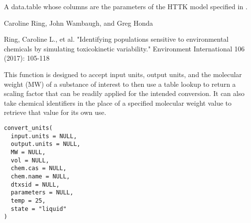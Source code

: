 \documentclass[a4paper]{book}
\begin{document}
%
\begin{Value}
A data.table whose columns are the parameters of the HTTK model
specified in .
\end{Value}
%
\begin{Author}\relax
Caroline Ring, John Wambaugh, and Greg Honda
\end{Author}
%
\begin{References}\relax
Ring, Caroline L., et al. "Identifying populations sensitive to 
environmental chemicals by simulating toxicokinetic variability." Environment 
International 106 (2017): 105-118
\end{References}
%
\begin{Description}\relax
This function is designed to accept input units, output units, and the 
molecular weight (MW) of a substance of interest to then use a table lookup
to return a scaling factor that can be readily applied for the intended
conversion. It can also take chemical identifiers in the place of a 
specified molecular weight value to retrieve that value for its own use.
\end{Description}
%
\begin{Usage}
\begin{verbatim}
convert_units(
  input.units = NULL,
  output.units = NULL,
  MW = NULL,
  vol = NULL,
  chem.cas = NULL,
  chem.name = NULL,
  dtxsid = NULL,
  parameters = NULL,
  temp = 25,
  state = "liquid"
)
\end{verbatim}
\end{Usage}
%
\end{document}
